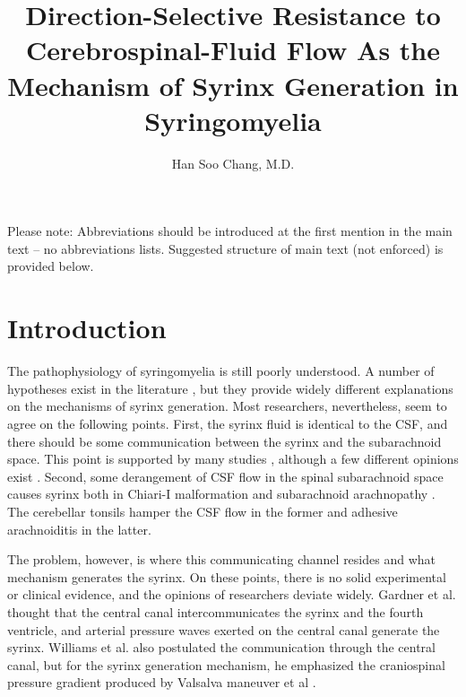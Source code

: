 \documentclass[fleqn,10pt]{wlscirep}
\title{Direction-Selective Resistance to Cerebrospinal-Fluid Flow As
the Mechanism of Syrinx Generation in Syringomyelia}
\author{Han Soo Chang, M.D.}
\affil{Department of Neurosurgery, Tokai University\\Isehara, Japan}
\begin{document}
\flushbottom
\maketitle
%
%
\thispagestyle{empty}

\noindent Please note: Abbreviations should be introduced at the first mention in the main text – no abbreviations lists. Suggested structure of main text (not enforced) is provided below.

\section*{Introduction}

The pathophysiology of syringomyelia is still poorly understood. A number
of hypotheses exist in the literature \cite{gardner1958mechanism,
williams1980pathogenesis, milhorat1999chiari, ball1972pathogenesis,
klekamp2002pathophysiology, duboulay1974mechanism, heiss1999elucidating,
milhorat1993anatomical, stoodley2000pathophysiology, terae1994increased,
chang2003hypothesis, chang2004theoretical, greitz2006unraveling}, but
they provide widely different explanations on the mechanisms of syrinx
generation.  Most researchers, nevertheless, seem to agree on the following
points. First, the syrinx fluid is identical to the CSF, and there should
be some communication between the syrinx and the subarachnoid space. This
point is supported by many studies \cite{ellertsson1969syringomyelia,
ellertsson1969myelocystographic, li1987conventional, heiss2019origin},
although a few different opinions exist \cite{greitz2006unraveling,
koyanagi1997surgical}. Second, some derangement of CSF flow in the spinal
subarachnoid space causes syrinx both in Chiari-I malformation
\cite{wolpert1994chiari, bhadelia1995cerebrospinal, heiss1999elucidating,
hofmann2000phasecontrast, quigley2004cerebrospinal} and subarachnoid
arachnopathy \cite{klekamp1997treatment, brodbelt2003altered,
heiss2012pathophysiology, chang2014dorsal}. The cerebellar tonsils hamper
the CSF flow in the former and adhesive arachnoiditis in the latter.

The problem, however, is where this communicating channel resides and what
mechanism generates the syrinx. On these points, there is no solid
experimental or clinical evidence, and the opinions of researchers deviate
widely. Gardner et al. \cite{gardner1958mechanism} thought that the central
canal intercommunicates the syrinx and the fourth ventricle, and arterial
pressure waves exerted on the central canal generate the syrinx. Williams
et al. also postulated the communication through the central canal, but for
the syrinx generation mechanism, he emphasized the craniospinal pressure
gradient produced by Valsalva maneuver et al
\cite{williams1980pathogenesis}.
\end{document}
